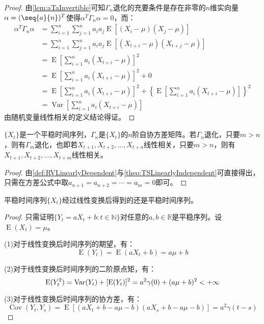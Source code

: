 \begin{proof}
	由\cref{lem:aTaInvertible}可知$\Gamma_n$退化的充要条件是存在非零的$n$维实向量$\alpha=(\seq{a}{n})^T$使得$\alpha^T\Gamma_n\alpha=0$，而：
	\begin{align*}
		\alpha^T\Gamma_n\alpha
		&=\sum_{i=1}^{n}\sum_{j=1}^{n}a_ia_j\operatorname{E}[(X_i-\mu)(X_j-\mu)] \\
		&=\sum_{i=1}^{n}\sum_{j=1}^{n}a_ia_j\operatorname{E}[(X_{t+i}-\mu)(X_{t+j}-\mu)] \\
		&=\operatorname{E}\left[\sum_{i=1}^{n}a_i(X_{t+i}-\mu)\right]^2 \\
		&=\operatorname{E}\left[\sum_{i=1}^{n}a_i(X_{t+i}-\mu)\right]^2+0 \\
		&=\operatorname{E}\left[\sum_{i=1}^{n}a_i(X_{t+i}-\mu)\right]^2+\left\{\operatorname{E}\left[\sum_{i=1}^{n}a_i(X_{t+i}-\mu)\right]\right\}^2 \\
		&=\operatorname{Var}\left[\sum_{i=1}^{n}a_i(X_{t+i}-\mu)\right]
	\end{align*}
	由随机变量线性相关的定义结论得证。
\end{proof}
\begin{theorem}
	$\{X_t\}$是一个平稳时间序列，$\Gamma_n$是$\{X_t\}$的$n$阶自协方差矩阵。若$\Gamma_n$退化，只要$m>n$，则有$\Gamma_m$退化，也即若$X_{t+1},X_{t+2},\dots,X_{t+n}$线性相关，只要$m>n$，则有$X_{t+1},X_{t+2},\dots,X_{t+m}$线性相关。
\end{theorem}
\begin{proof}
	由\cref{def:RVLinearlyDependent}与\cref{theo:TSLinearlyIndependent}可直接得出，只需在方差公式中取$a_{n+1}=a_{n+2}=\cdots=a_{m}=0$即可。
\end{proof}
\begin{theorem}
	平稳时间序列$\{X_t\}$经过线性变换后得到的还是平稳时间序列。
\end{theorem}
\begin{proof}
	只需证明$\{Y_t=aX_t+b:t\in\mathbb{N}\}$对任意的$a,b\in\mathbb{R}$是平稳序列。设$\operatorname{E}(X_t)=\mu$。\par
	(1)对于线性变换后时间序列的期望，有：
	\begin{equation*}
		\operatorname{E}(Y_t)=\operatorname{E}(aX_t+b)=a\mu+b
	\end{equation*}\par
	(2)对于线性变换后时间序列的二阶原点矩，有：
	\begin{equation*}
		\operatorname{E}(Y_t^2)=\operatorname{Var}(Y_t)+[\operatorname{E}(Y_t)]^2=a^2\gamma(0)+(a\mu+b)^2<+\infty\qedhere
	\end{equation*}\par
	(3)对于线性变换后时间序列的协方差，有：
	\begin{equation*}
		\operatorname{Cov}(Y_t,Y_s)=\operatorname{E}[(aX_t+b-a\mu-b)(aX_s+b-a\mu-b)]=a^2\gamma(t-s)
	\end{equation*}
\end{proof}
